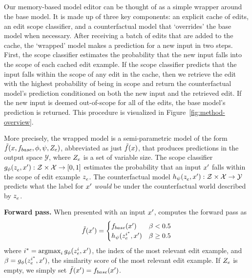 \documentclass{article}
\begin{document}
\subsection{{\fullname}}
\label{sec:editor}

Our memory-based model editor can be thought of as a simple wrapper around the base model. It is made up of three key components: an explicit cache of edits, an edit scope classifier, and a counterfactual model that `overrides' the base model when necessary. After receiving a batch of edits that are added to the cache, the `wrapped' model makes a prediction for a new input in two steps. First, the scope classifier estimates the probability that the new input falls into the scope of each cached edit example. If the scope classifier predicts that the input falls within the scope of any edit in the cache, then we retrieve the edit with the highest probability of being in scope and return the counterfactual model's prediction conditioned on both the new input and the retrieved edit. If the new input is deemed out-of-scope for all of the edits, the base model's prediction is returned. This procedure is visualized in Figure~\ref{fig:method-overview}.

More precisely, the wrapped model is a semi-parametric model of the form $\semimodel(x, \basemodel, \phi, \psi, \edits)$, abbreviated as just $\semimodel(x)$, that produces predictions in the output space $\mathcal{Y}$, where $\edits$ is a set of variable size. The scope classifier $\cls(\ze, \xunk) : \mathcal{Z} \times \inp  \rightarrow [0, 1]$ estimates the probability that an input $\xunk$ falls within the scope of edit example $\ze$. The counterfactual model $\rep(\ze, \xunk) : \mathcal{Z} \times \inp \rightarrow \out$ predicts what the label for $\xunk$ \textit{would} be under the counterfactual world described by $\ze$. 

\textbf{Forward pass.} When presented with an input $\xunk$, {\name} computes the forward pass as
\begin{equation}
    \semimodel(\xunk) = 
    \begin{cases}
        \basemodel(\xunk) & \beta < 0.5 \\
        \rep(\ze[i^*], \xunk) & \beta \ge 0.5
    \end{cases}
\end{equation}
where $i^* = \argmax_i \cls(\ze[i], \xunk)$, the index of the most relevant edit example, and $\beta = \cls( \ze[i^*], \xunk)$, the similarity score of the most relevant edit example. If $\edits$ is empty, we simply set $\semimodel(\xunk) = \basemodel(\xunk)$.
\end{document}
